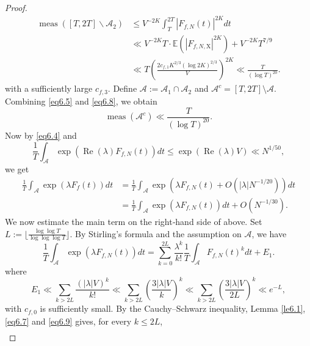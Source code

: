 \documentclass[10pt,a4paper]{amsart}
\begin{document}
\begin{proof}
\begin{equation}
    \begin{aligned}
\operatorname{meas}\left([T, 2 T] \backslash \mathcal{A}_2\right) & \leqslant V^{-2 K} \int_T^{2 T}\left|F_{f,N}(t)\right|^{2 K} d t \\
& \ll V^{-2 K} T \cdot \mathbb{E}\left(\left|F_{f,N, \mathrm{X}}\right|^{2 K}\right)+V^{-2 K} T^{7 / 9} \\
& \ll T\left(\frac{2 c_{f,1} K^{2 /3}\left(\log 2K\right)^{2/3}}{V}\right)^{2 K} \ll \frac{T}{(\log T)^{20}}.
\end{aligned}
\end{equation}
with a sufficiently large $c_{f,3}$. Define $\mathcal{A} := \mathcal{A}_1 \cap \mathcal{A}_2$ and  $\mathcal{A}^c = [T, 2T] \setminus \mathcal{A}$. Combining \eqref{eq6.5} and \eqref{eq6.8}, we obtain
\begin{equation}\label{eq6.9}
    \operatorname{meas}\left(\mathcal{A}^c\right) \ll \frac{T}{(\log T)^{20}} .
\end{equation}
Now by \eqref{eq6.4} and 
\[
\frac{1}{T} \int_{\mathcal{A}} \exp \left(\operatorname{Re}(\lambda) F_{f,N}(t)\right) d t \leqslant \exp (\operatorname{Re}(\lambda) V) \ll N^{1 / 50},
\]
we get
\begin{equation}\label{eq6.10}
    \begin{aligned}
\frac{1}{T} \int_{\mathcal{A}} \exp (\lambda F_f(t)) d t & =\frac{1}{T} \int_{\mathcal{A}} \exp \left(\lambda F_{f,N}(t)+O\left(|\lambda| N^{-1 / 20}\right)\right) d t \\
& =\frac{1}{T} \int_{\mathcal{A}} \exp \left(\lambda F_{f,N}(t)\right) d t+O\left(N^{-1 / 30}\right).
\end{aligned}
\end{equation}
We now estimate the main term on the right‑hand side of above. Set $L := \bigl\lfloor \frac{\log \log T}{\log \log \log T}  \bigr\rfloor$. By Stirling’s formula and the assumption on $\mathcal{A}$, we have
\begin{equation}\label{eq6.11}
    \frac{1}{T} \int_{\mathcal{A}} \exp \left(\lambda F_{f,N}(t)\right) d t=\sum_{k=0}^{2 L} \frac{\lambda^k}{k!} \frac{1}{T} \int_{\mathcal{A}} F_{f,N}(t)^k d t+E_1.
\end{equation}
where
\[
E_1 \ll \sum_{k>2 L} \frac{(|\lambda| V)^k}{k!} \ll \sum_{k>2 L}\left(\frac{3|\lambda| V}{k}\right)^k \ll \sum_{k>2 L}\left(\frac{3|\lambda| V}{2 L}\right)^k \ll e^{-L},
\]
with $c_{f,0}$ is sufficiently small. By the Cauchy--Schwarz inequality, Lemma \ref{le6.1}, \eqref{eq6.7} and \eqref{eq6.9} gives, for every $k \leqslant 2L$,
\[
\begin{aligned}

\end{aligned}\]
\end{proof}
\end{document}
